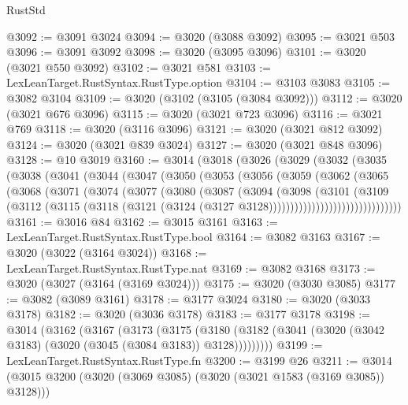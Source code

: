 \begin{lexlean}{RustStd}
\begin{coremodule}
@3092 := @3091 @3024
@3094 := @3020 (@3088 @3092)
@3095 := @3021 @503
@3096 := @3091 @3092
@3098 := @3020 (@3095 @3096)
@3101 := @3020 (@3021 @550 @3092)
@3102 := @3021 @581
@3103 := LexLeanTarget.RustSyntax.RustType.option
@3104 := @3103 @3083
@3105 := @3082 @3104
@3109 := @3020 (@3102 (@3105 (@3084 @3092)))
@3112 := @3020 (@3021 @676 @3096)
@3115 := @3020 (@3021 @723 @3096)
@3116 := @3021 @769
@3118 := @3020 (@3116 @3096)
@3121 := @3020 (@3021 @812 @3092)
@3124 := @3020 (@3021 @839 @3024)
@3127 := @3020 (@3021 @848 @3096)
@3128 := @10 @3019
@3160 := @3014
    (@3018
      (@3026
        (@3029
          (@3032
            (@3035
              (@3038
                (@3041
                  (@3044
                    (@3047
                      (@3050
                        (@3053
                          (@3056
                            (@3059
                              (@3062
                                (@3065
                                  (@3068
                                    (@3071
                                      (@3074
                                        (@3077
                                          (@3080
                                            (@3087
                                              (@3094
                                                (@3098
                                                  (@3101
                                                    (@3109
                                                      (@3112
                                                        (@3115
                                                          (@3118
                                                            (@3121
                                                              (@3124
                                                                (@3127
                                                                  @3128)))))))))))))))))))))))))))))))
@3161 := @3016 @84
@3162 := @3015 @3161
@3163 := LexLeanTarget.RustSyntax.RustType.bool
@3164 := @3082 @3163
@3167 := @3020 (@3022 (@3164 @3024))
@3168 := LexLeanTarget.RustSyntax.RustType.nat
@3169 := @3082 @3168
@3173 := @3020 (@3027 (@3164 (@3169 @3024)))
@3175 := @3020 (@3030 @3085)
@3177 := @3082 (@3089 @3161)
@3178 := @3177 @3024
@3180 := @3020 (@3033 @3178)
@3182 := @3020 (@3036 @3178)
@3183 := @3177 @3178
@3198 := @3014
    (@3162
      (@3167
        (@3173
          (@3175
            (@3180 (@3182 (@3041 (@3020 (@3042 @3183) (@3020 (@3045 (@3084 @3183)) @3128)))))))))
@3199 := LexLeanTarget.RustSyntax.RustType.fn
@3200 := @3199 @26
@3211 := @3014 (@3015 @3200 (@3020 (@3069 @3085) (@3020 (@3021 @1583 (@3169 @3085)) @3128)))

\end{coremodule}
\end{lexlean}
